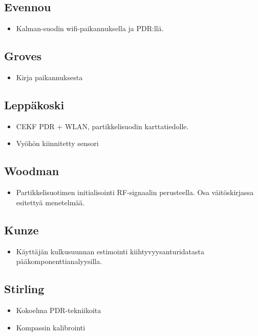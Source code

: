 \documentclass[a4paper]{scrartcl}
\begin{document}
\subsection{Evennou\cite{evennou2006advanced}}
\begin{itemize}
  \item Kalman-suodin wifi-paikannuksella ja PDR:llä.
\end{itemize}

\subsection{Groves\cite{groves2013principles}}
\begin{itemize}
  \item Kirja paikannuksesta
\end{itemize}

\subsection{Leppäkoski\cite{leppakoski2013pedestrian}}
\begin{itemize}
  \item CEKF PDR + WLAN, partikkelisuodin karttatiedolle.
  \item Vyöhön kiinnitetty sensori
\end{itemize}

\subsection{Woodman\cite{woodman2009rf}}
\begin{itemize}
  \item Partikkelisuotimen initialisointi RF-signaalin perusteella. Osa
    väitöskirjassa esitettyä menetelmää.
\end{itemize}

\subsection{Kunze\cite{kunze2009way}}
\begin{itemize}
  \item Käyttäjän kulkusuunnan estimointi kiihtyvyysanturidatasta
    pääkomponenttianalyysilla.
\end{itemize}

\subsection{Stirling\cite{stirling2003innovative}}
\begin{itemize}
  \item Kokoelma PDR-tekniikoita
  \item Kompassin kalibrointi
 \end{itemize}
\end{document}
